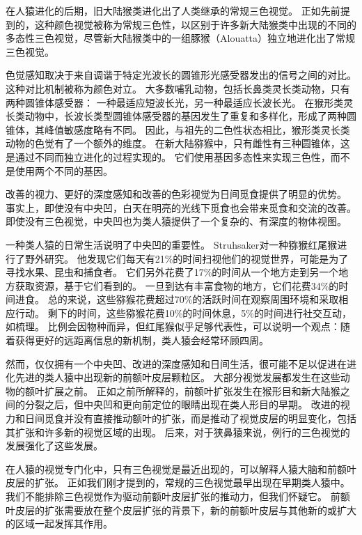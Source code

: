 在人猿进化的后期，旧大陆猴类进化出了人类继承的常规三色视觉。
正如先前提到的，这种颜色视觉被称为常规三色性，以区别于许多新大陆猴类中出现的不同的多态性三色视觉，尽管新大陆猴类中的一组豚猴（Alouatta）独立地进化出了常规三色视觉。


色觉感知取决于来自调谐于特定光波长的圆锥形光感受器发出的信号之间的对比。
这种对比机制被称为颜色对立。
大多数哺乳动物，包括长鼻类灵长类动物，只有两种圆锥体感受器：
一种最适应短波长光，另一种最适应长波长光。
在猴形类灵长类动物中，长波长类型圆锥体感受器的基因发生了重复和多样化，形成了两种圆锥体，其峰值敏感度略有不同。
因此，与祖先的二色性状态相比，猴形类灵长类动物的色觉有了一个额外的维度。
在新大陆猕猴中，只有雌性有三种圆锥体，这是通过不同而独立进化的过程实现的。
它们使用基因多态性来实现三色性，而不是使用两个不同的基因。


改善的视力、更好的深度感知和改善的色彩视觉为日间觅食提供了明显的优势。
事实上，即使没有中央凹，白天在明亮的光线下觅食也会带来觅食和交流的改善。
即使没有三色视觉，中央凹也为类人猿提供了一个复杂的、有深度的物体视图。


一种类人猿的日常生活说明了中央凹的重要性。
Struhsaker\cite{struhsaker1980comparison}对一种猕猴红尾猴进行了野外研究。
他发现它们每天有21\%的时间扫视他们的视觉世界，可能是为了寻找水果、昆虫和捕食者。
它们另外花费了17\%的时间从一个地方走到另一个地方获取资源，基于它们看到的。
一旦到达有丰富食物的地方，它们花费34\%的时间进食。
总的来说，这些猕猴花费超过70\%的活跃时间在观察周围环境和采取相应行动。
剩下的时间，这些猕猴花费10\%的时间休息，5\%的时间进行社交互动，如梳理。
比例会因物种而异，但红尾猴似乎足够代表性，可以说明一个观点：随着获得更好的远距离信息的新机制，类人猿会经常环顾四周。


然而，仅仅拥有一个中央凹、改进的深度感知和日间生活，很可能不足以促进在进化先进的类人猿中出现新的前额叶皮层颗粒区。
大部分视觉发展都发生在这些动物的额叶扩展之前。
正如之前所解释的，前额叶扩张发生在猴形目和新大陆猴之间的分裂之后，但中央凹和更向前定位的眼睛出现在类人形目的早期。
改进的视力和日间觅食并没有直接推动额叶的扩张，而是推动了视觉皮层的明显变化，包括其扩张和许多新的视觉区域的出现\cite{kaas2020evolution}。
后来，对于狭鼻猿来说，例行的三色视觉的发展强化了这些发展。


在人猿的视觉专门化中，只有三色视觉是最近出现的，可以解释人猿大脑和前额叶皮层的扩张。
正如我们刚才提到的，常规的三色视觉最早出现在早期类人猿中。
我们不能排除三色视觉作为驱动前额叶皮层扩张的推动力，但我们怀疑它。
前额叶皮层的扩张需要放在整个皮层扩张的背景下，新的前额叶皮层与其他新的或扩大的区域一起发挥其作用。


